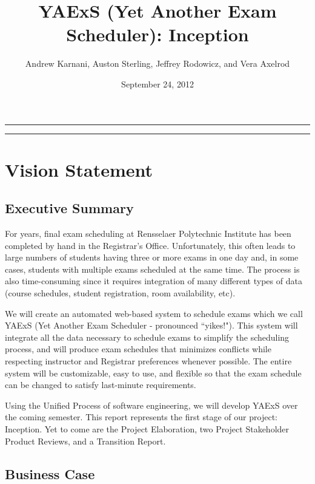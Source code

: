 \documentclass[11pt]{article}
\author{Andrew Karnani, Auston Sterling, Jeffrey Rodowicz, and Vera Axelrod}
\title{YAExS {(Yet Another Exam Scheduler)}: Inception}
\date{September 24, 2012}
\begin{document}
\maketitle
\vspace{-0.1in}
\hrule

\tableofcontents %

\vspace{0.3in}
\hrule

\section{Vision Statement}
\subsection{Executive Summary} %

For years, final exam scheduling at Rensselaer Polytechnic Institute has been
 completed by hand in the Registrar’s Office.
Unfortunately, this often leads to large numbers of students having three or more
 exams in one day and, in some cases, students with multiple exams scheduled at
 the same time.
 The process is also time-consuming since it requires integration of many different
 types of data (course schedules, student registration, room availability, etc).

We will create an automated web-based system to schedule exams which we call YAExS
(Yet Another Exam Scheduler - pronounced ``yikes!").
This system will integrate all the data necessary to schedule exams to simplify the
scheduling process, and will produce exam schedules that minimizes conflicts
while respecting instructor and Registrar preferences whenever possible.
The entire system will be customizable, easy to use, and flexible
so that the exam schedule can be changed to satisfy last-minute requirements.

Using the Unified Process of software engineering, we will develop YAExS
 over the coming semester.
This report represents the first stage of our project: Inception.
Yet to come are the Project Elaboration, two Project Stakeholder Product Reviews,
 and a Transition Report.


\subsection{Business Case} %
\end{document}
